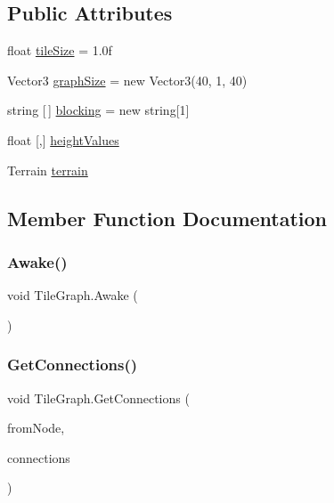 \subsection*{Public Attributes}
\begin{DoxyCompactItemize}
\item 
float \mbox{\hyperlink{class_tile_graph_ae6728f48acf48baa4400f8829cc29bc3}{tile\+Size}} = 1.\+0f
\item 
Vector3 \mbox{\hyperlink{class_tile_graph_a2d996c82ced0508bb04cbdf1a45ba144}{graph\+Size}} = new Vector3(40, 1, 40)
\item 
string \mbox{[}$\,$\mbox{]} \mbox{\hyperlink{class_tile_graph_a882d4a8adc35cb6a66f4d29d63dcb0c0}{blocking}} = new string\mbox{[}1\mbox{]}
\item 
float \mbox{[},\mbox{]} \mbox{\hyperlink{class_tile_graph_a5e585742f9ecd6ce5e3a0abb55a9f89b}{height\+Values}}
\item 
Terrain \mbox{\hyperlink{class_tile_graph_a064f51b86f086091ec4b9fff14c554e2}{terrain}}
\end{DoxyCompactItemize}


\subsection{Member Function Documentation}
\mbox{\label{class_tile_graph_a4e921f79aca67d58cad7367227fe8c06}} 
\subsubsection{\texorpdfstring{Awake()}{Awake()}}
{\footnotesize\ttfamily void Tile\+Graph.\+Awake (\begin{DoxyParamCaption}{ }\end{DoxyParamCaption})}

\mbox{\label{class_tile_graph_a36cabbaca38766f02b95a82ee0967ebc}} 
\subsubsection{\texorpdfstring{Get\+Connections()}{GetConnections()}}
{\footnotesize\ttfamily void Tile\+Graph.\+Get\+Connections (\begin{DoxyParamCaption}\item[{\mbox{\hyperlink{struct_int_point}{Int\+Point}}}]{from\+Node,  }\item[{out List$<$ \mbox{\hyperlink{interface_i_connection}{I\+Connection}}$<$ \mbox{\hyperlink{struct_int_point}{Int\+Point}} $>$$>$}]{connections }\end{DoxyParamCaption})}



